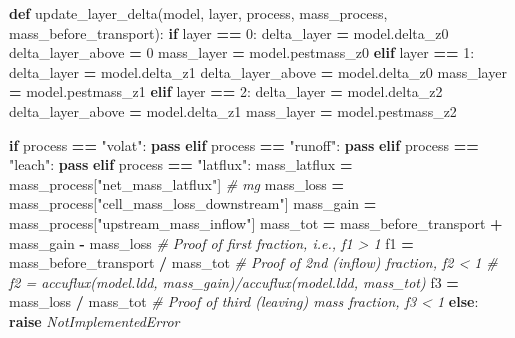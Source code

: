 \documentclass[]{article}
\newenvironment{Shaded}{\begin{snugshade}}{\end{snugshade}}
\newcommand{\KeywordTok}[1]{\textcolor[rgb]{0.13,0.29,0.53}{\textbf{{#1}}}}
\newcommand{\DecValTok}[1]{\textcolor[rgb]{0.00,0.00,0.81}{{#1}}}
\newcommand{\StringTok}[1]{\textcolor[rgb]{0.31,0.60,0.02}{{#1}}}
\newcommand{\CommentTok}[1]{\textcolor[rgb]{0.56,0.35,0.01}{\textit{{#1}}}}
\newcommand{\ControlFlowTok}[1]{\textcolor[rgb]{0.13,0.29,0.53}{\textbf{{#1}}}}
\newcommand{\OperatorTok}[1]{\textcolor[rgb]{0.81,0.36,0.00}{\textbf{{#1}}}}
\newcommand{\PreprocessorTok}[1]{\textcolor[rgb]{0.56,0.35,0.01}{\textit{{#1}}}}
\newcommand{\NormalTok}[1]{{#1}}
\begin{document}
\begin{Shaded}
\begin{Highlighting}[]

\KeywordTok{def} \NormalTok{update_layer_delta(model, layer, process, mass_process, mass_before_transport):}
    \ControlFlowTok{if} \NormalTok{layer }\OperatorTok{==} \DecValTok{0}\NormalTok{:}
      \NormalTok{delta_layer }\OperatorTok{=} \NormalTok{model.delta_z0}
      \NormalTok{delta_layer_above }\OperatorTok{=} \DecValTok{0}
      \NormalTok{mass_layer }\OperatorTok{=} \NormalTok{model.pestmass_z0}
    \ControlFlowTok{elif} \NormalTok{layer }\OperatorTok{==} \DecValTok{1}\NormalTok{:}
        \NormalTok{delta_layer }\OperatorTok{=} \NormalTok{model.delta_z1}
        \NormalTok{delta_layer_above }\OperatorTok{=} \NormalTok{model.delta_z0}
        \NormalTok{mass_layer }\OperatorTok{=} \NormalTok{model.pestmass_z1}
    \ControlFlowTok{elif} \NormalTok{layer }\OperatorTok{==} \DecValTok{2}\NormalTok{:}
        \NormalTok{delta_layer }\OperatorTok{=} \NormalTok{model.delta_z2}
        \NormalTok{delta_layer_above }\OperatorTok{=} \NormalTok{model.delta_z1}
        \NormalTok{mass_layer }\OperatorTok{=} \NormalTok{model.pestmass_z2}
        
    \ControlFlowTok{if} \NormalTok{process }\OperatorTok{==} \StringTok{"volat"}\NormalTok{:}
        \ControlFlowTok{pass}
    \ControlFlowTok{elif} \NormalTok{process }\OperatorTok{==} \StringTok{"runoff"}\NormalTok{:}
        \ControlFlowTok{pass}
    \ControlFlowTok{elif} \NormalTok{process }\OperatorTok{==} \StringTok{"leach"}\NormalTok{:}
        \ControlFlowTok{pass}
    \ControlFlowTok{elif} \NormalTok{process }\OperatorTok{==} \StringTok{"latflux"}\NormalTok{:}
        \NormalTok{mass_latflux }\OperatorTok{=} \NormalTok{mass_process[}\StringTok{"net_mass_latflux"}\NormalTok{]  }\CommentTok{# mg}
        \NormalTok{mass_loss }\OperatorTok{=} \NormalTok{mass_process[}\StringTok{"cell_mass_loss_downstream"}\NormalTok{]}
        \NormalTok{mass_gain }\OperatorTok{=} \NormalTok{mass_process[}\StringTok{"upstream_mass_inflow"}\NormalTok{]}
        \NormalTok{mass_tot }\OperatorTok{=} \NormalTok{mass_before_transport }\OperatorTok{+} \NormalTok{mass_gain }\OperatorTok{-} \NormalTok{mass_loss}
        \CommentTok{# Proof of first fraction, i.e., f1 > 1}
        \NormalTok{f1 }\OperatorTok{=} \NormalTok{mass_before_transport }\OperatorTok{/} \NormalTok{mass_tot}
        \CommentTok{# Proof of 2nd (inflow) fraction, f2 < 1}
        \CommentTok{# f2 = accuflux(model.ldd, mass_gain)/accuflux(model.ldd, mass_tot)}
        \NormalTok{f3 }\OperatorTok{=} \NormalTok{mass_loss }\OperatorTok{/} \NormalTok{mass_tot  }\CommentTok{# Proof of third (leaving) mass fraction, f3 < 1}
    \ControlFlowTok{else}\NormalTok{:}
        \ControlFlowTok{raise} \PreprocessorTok{NotImplementedError}


\end{Highlighting}
\end{Shaded}
\end{document}
